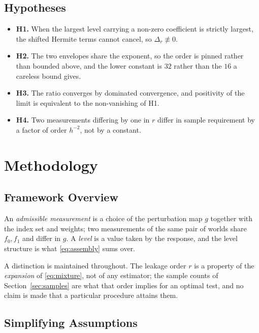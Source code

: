 \documentclass[conference]{IEEEtran}
\theoremstyle{definition}
\begin{document}
\subsection{Hypotheses}

\begin{itemize}
\item \textbf{H1.} When the largest level carrying a non-zero coefficient is strictly
largest, the shifted Hermite terms cannot cancel, so $\Delta_{r}\not\equiv0$.
\item \textbf{H2.} The two envelopes share the exponent, so the order is pinned rather than
bounded above, and the lower constant is $32$ rather than the $16$ a careless bound gives.
\item \textbf{H3.} The ratio converges by dominated convergence, and positivity of the limit
is equivalent to the non-vanishing of H1.
\item \textbf{H4.} Two measurements differing by one in $r$ differ in sample requirement by a
factor of order $h^{-2}$, not by a constant.
\end{itemize}

\section{Methodology}
\label{sec:setting}

\subsection{Framework Overview}

An \emph{admissible measurement} is a choice of the perturbation map $g$ together with the
index set and weights; two measurements of the same pair of worlds share $f_{0},f_{1}$ and
differ in $g$. A \emph{level} is a value taken by the response, and the level structure is
what \eqref{eq:assembly} sums over.

A distinction is maintained throughout. The leakage order $r$ is a property of the
\emph{expansion} of \eqref{eq:mixture}, not of any estimator; the sample counts of
Section~\ref{sec:samples} are what that order implies for an optimal test, and no claim is
made that a particular procedure attains them.

\subsection{Simplifying Assumptions}
\end{document}
